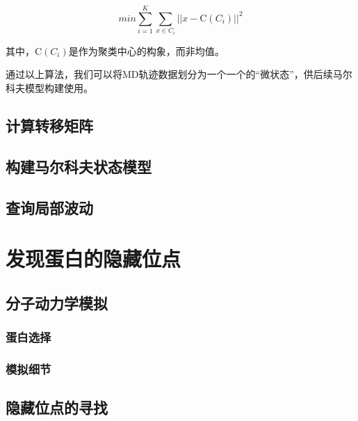 \documentclass[a4paper]{article}
\begin{document}
\begin{CJK}{UTF8}{gbsn}
\begin{equation}
min\sum_{i=1}^{K}\sum_{x\in C_{i}}^{} {\vert\vert x- \mathrm C(C_{i}) \vert\vert}^{2}
\end{equation}


其中，$\mathrm C(C_{i})$是作为聚类中心的构象，而非均值。

通过以上算法，我们可以将MD轨迹数据划分为一个一个的“微状态”，供后续马尔科夫模型构建使用。

	\subsection{计算转移矩阵}
	\subsection{构建马尔科夫状态模型}
	\subsection{查询局部波动}

\section{发现蛋白的隐藏位点}
	\subsection{分子动力学模拟}
		\subsubsection{蛋白选择}
		\subsubsection{模拟细节}
	\subsection{隐藏位点的寻找}




\end{CJK}
\end{document}
